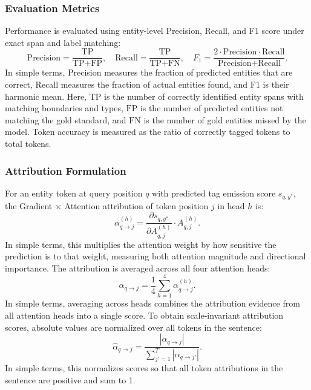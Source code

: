\documentclass[pdflatex,sn-mathphys-num]{sn-jnl}
\begin{document}
\subsubsection{Evaluation Metrics}
Performance is evaluated using entity-level Precision, Recall, and F1 score under exact span and label matching:
\begin{equation}
\text{Precision} = \frac{\text{TP}}{\text{TP} + \text{FP}}, \quad
\text{Recall} = \frac{\text{TP}}{\text{TP} + \text{FN}}, \quad
F_1 = \frac{2 \cdot \text{Precision} \cdot \text{Recall}}{\text{Precision} + \text{Recall}}.
\end{equation}
In simple terms, Precision measures the fraction of predicted entities that are correct, Recall measures the fraction of actual entities found, and F1 is their harmonic mean. Here, $\text{TP}$ is the number of correctly identified entity spans with matching boundaries and types, $\text{FP}$ is the number of predicted entities not matching the gold standard, and $\text{FN}$ is the number of gold entities missed by the model. Token accuracy is measured as the ratio of correctly tagged tokens to total tokens.

\subsubsection{Attribution Formulation}
For an entity token at query position $q$ with predicted tag emission score $s_{q, y^*}$, the Gradient $\times$ Attention attribution of token position $j$ in head $h$ is:
\begin{equation}
\alpha^{(h)}_{q \to j} = \frac{\partial s_{q, y^*}}{\partial A^{(h)}_{q, j}} \cdot A^{(h)}_{q, j}.
\end{equation}
In simple terms, this multiplies the attention weight by how sensitive the prediction is to that weight, measuring both attention magnitude and directional importance. The attribution is averaged across all four attention heads:
\begin{equation}
\alpha_{q \to j} = \frac{1}{4} \sum_{h=1}^4 \alpha^{(h)}_{q \to j}.
\end{equation}
In simple terms, averaging across heads combines the attribution evidence from all attention heads into a single score. To obtain scale-invariant attribution scores, absolute values are normalized over all tokens in the sentence:
\begin{equation}
\hat{\alpha}_{q \to j} = \frac{|\alpha_{q \to j}|}{\sum_{j'=1}^T |\alpha_{q \to j'}|}.
\end{equation}
In simple terms, this normalizes scores so that all token attributions in the sentence are positive and sum to 1.
\end{document}

